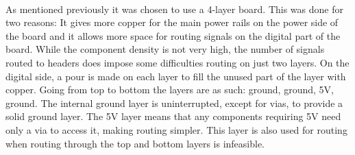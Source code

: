 ~\\
As mentioned previously it was chosen to use a 4-layer board.
This was done for two reasons: It gives more copper for the main power rails on the power side of the board and it allows more space for routing signals on the digital part of the board.
While the component density is not very high, the number of signals routed to headers does impose some difficulties routing on just two layers.
On the digital side, a pour is made on each layer to fill the unused part of the layer with copper.
Going from top to bottom the layers are as such: ground, ground, 5V, ground.
The internal ground layer is uninterrupted, except for vias, to provide a solid ground layer.
The 5V layer means that any components requiring 5V need only a via to access it, making routing simpler.
This layer is also used for routing when routing through the top and bottom layers is infeasible.



